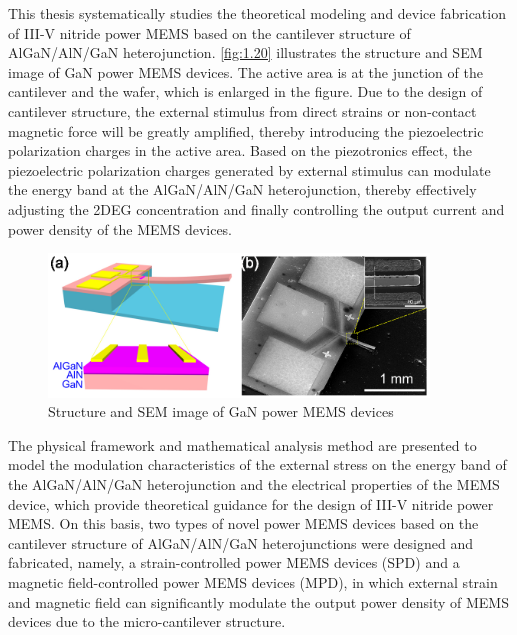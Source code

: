 \noindent This thesis systematically studies the theoretical modeling and device fabrication of III-V nitride power MEMS based on the cantilever  structure of  AlGaN/AlN/GaN heterojunction. \autoref{fig:1.20} illustrates the structure and SEM  image of GaN power MEMS devices. The active area  is at the junction of the cantilever and the  wafer, which is enlarged in the figure. Due to the design of cantilever  structure, the external stimulus from direct  strains or non-contact magnetic force  will be greatly amplified, thereby introducing the piezoelectric polarization charges  in the active  area. Based on the piezotronics  effect, the piezoelectric polarization charges generated by external stimulus can modulate the energy band at the AlGaN/AlN/GaN heterojunction, thereby effectively adjusting the 2DEG concentration  and finally controlling the output current  and power density of the MEMS devices.

\begin{figure}[H] 
\centering    
\includegraphics[width=0.9\textwidth]{ch1_20}
\caption[Structure and SEM image of GaN power MEMS devices]{Structure and SEM image of GaN power MEMS devices}
\label{fig:1.20}
\end{figure}

The physical framework  and mathematical analysis method are presented to model the modulation  characteristics of the external stress on the energy band  of the  AlGaN/AlN/GaN heterojunction and the electrical properties of the MEMS  device, which provide theoretical guidance for the design of III-V nitride  power MEMS. On this basis, two types of novel power MEMS  devices based on the cantilever  structure of  AlGaN/AlN/GaN heterojunctions were designed and fabricated, namely, a strain-controlled power MEMS devices (SPD)  and a  magnetic field-controlled power MEMS devices (MPD), in which external strain  and magnetic field  can significantly modulate  the output power  density of MEMS  devices due to the micro-cantilever  structure.\\

